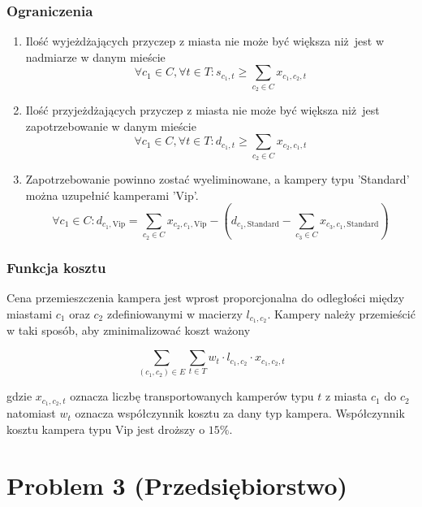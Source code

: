 \documentclass[a4paper,11pt]{article}
\theoremstyle{mytheor}
\begin{document}
\subsubsection*{Ograniczenia}
\begin{enumerate}
    \item Ilość wyjeżdżających przyczep z miasta nie może być większa niż jest w nadmiarze w danym mieście
    $$
        \forall c_1\in C, \forall t\in T: s_{c_1,t} \geq \sum_{c_2\in C} x_{c_1, c_2, t}
    $$
    \item Ilość przyjeżdżających przyczep z miasta nie może być większa niż jest zapotrzebowanie w danym mieście
    $$
        \forall c_1\in C, \forall t\in T: d_{c_1,t} \geq \sum_{c_2\in C} x_{c_2, c_1, t}
    $$
    \item Zapotrzebowanie powinno zostać wyeliminowane, a kampery typu 'Standard' można uzupełnić kamperami 'Vip'.
    $$
        \forall c_1\in C: d_{c_1, \text{Vip}} = \sum_{c_2\in C} x_{c_2,c_1,\text{Vip}} - (d_{c_1,\text{Standard}} - \sum_{c_3\in C} x_{c_3,c_1,\text{Standard}})
    $$
\end{enumerate}

\subsubsection*{Funkcja kosztu}
Cena przemieszczenia kampera jest wprost proporcjonalna do odległości między miastami $c_1$ oraz $c_2$ zdefiniowanymi w macierzy $l_{c_1,c_2}$. Kampery należy przemieścić w taki sposób, aby zminimalizować koszt ważony

$$
    \sum_{(c_1, c_2)\in E} \sum_{t\in T} w_{t} \cdot l_{c_1, c_2} \cdot x_{c_1, c_2, t}
$$

gdzie $x_{c_1, c_2, t}$ oznacza liczbę transportowanych kamperów typu $t$ z miasta $c_1$ do $c_2$ natomiast $w_t$ oznacza współczynnik kosztu za dany typ kampera. Współczynnik kosztu kampera typu Vip jest droższy o $15\%$.



\section*{Problem 3 (Przedsiębiorstwo)}
\end{document}
